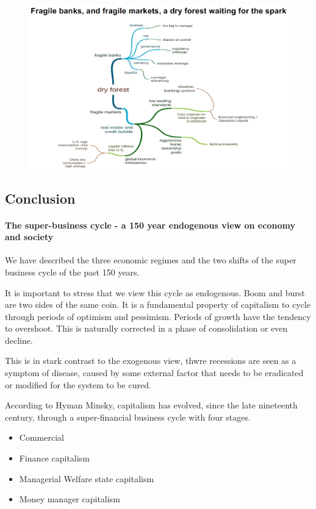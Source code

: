 \begin{figure}[h]
    \centering
    \includegraphics[width=\textwidth]{Pictures/dry_forest.png}
\end{figure}

\subsection{Conclusion}

\paragraph{The super-business cycle - a 150 year endogenous view on
economy and society}

We have described the three economic regimes and the two shifts of the
super business cycle of the past 150 years.

It is important to stress that we view this cycle as endogenous. Boom
and burst are two sides of the same coin. It is a fundamental property
of capitalism to cycle through periods of optimism and pessimism. Periods
of growth have the tendency to overshoot. This is naturally corrected in a
phase of consolidation or even decline.

This is in stark contrast to the exogenous view, thwre recessions are seen
as a symptom of disease, caused by some external factor that needs to be
eradicated or modified for the system to be cured.

According to Hyman Minsky, capitalism has evolved, since the late nineteenth
century, through a super-financial business cycle with four stages.

\begin{itemize}
    \item Commercial
    \item Finance capitalism
    \item Managerial Welfare state capitalism
    \item Money manager capitalism
\end{itemize}

